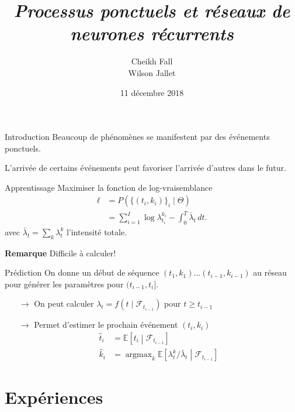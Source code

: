 \documentclass{beamer}
\title{
	\textit{Processus ponctuels et réseaux de neurones récurrents}
}
\author{
	Cheikh Fall\\
	Wilson Jallet
}
\date{11 décembre 2018}
\newcommand{\EE}{\mathbb{E}}
\DeclareMathOperator*{\argmax}{argmax} %
\begin{document}
\maketitle

\begin{frame}{Introduction}
Beaucoup de phénomènes se manifestent par des événements ponctuels.\pause

L'arrivée de certains événements peut favoriser l'arrivée d'autres dans le futur.
\end{frame}



\begin{frame}{Apprentissage}
Maximiser la fonction de log-vraisemblance
\begin{equation}\label{eq:logLikelihood}
\begin{aligned}
\ell &= P\left( \{(t_i,k_i)\}_i \mid \Theta \right) \\
&= \sum_{i=1}^{I}\log \lambda^{k_i}_{t_i} - \int_0^T \bar{\lambda}_t\,dt.
\end{aligned}
\end{equation}
avec $\bar{\lambda}_t = \sum_k \lambda^k_t$ l'intensité totale.

\textbf{Remarque} Difficile à calculer!
\end{frame}

\begin{frame}{Prédiction}
On donne un début de séquence $(t_1,k_1)\ldots (t_{i-1}, k_{i-1})$ au réseau pour générer les paramètres pour $(t_{i-1}, t_i]$.
\begin{itemize}
	\item[$\rightarrow$] On peut calculer $\lambda_t = f(t\mid\mathcal{F}_{t_{i-1}})$ pour $t\geq t_{i-1}$
	\item[$\rightarrow$] Permet d'estimer le prochain événement $(t_i, k_i)$
	\[
	\begin{aligned}
		\hat{t}_i &= \EE\left[t_i \middle| \mathcal{F}_{t_{i-1}}\right] \\
		\hat{k}_i &= \argmax_{k}\EE\left[\lambda^k_t/\bar{\lambda}_t\middle| \mathcal{F}_{t_{i-1}} \right]
	\end{aligned}
	\]
\end{itemize}
\end{frame}

\section{Expériences}
\end{document}
